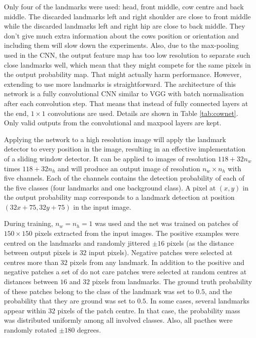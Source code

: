 \documentclass{cta-author}
\begin{document}
Only four of the landmarks were used: head, front middle, cow centre and back middle. 
The discarded landmarks left and right shoulder are close to front middle while the discarded landmarks left 
and right hip are close to back middle. They don't give much extra information about the cows position or 
orientation and including them will slow down the experiments. Also, due to the max-pooling used in the CNN, 
the output feature map has too low resolution to separate such close landmarks well, which mean that they 
might compete for the same pixels in the output probability map. That might actually harm performance. 
However, extending to use more landmarks is straightforward. The architecture of this network is a fully 
convolutional CNN similar to VGG \cite{Simonyan14c} with batch normalisation 
\cite{DBLP:journals/corr/IoffeS15} after each convolution step. That means that instead of fully connected 
layers at the end, $1 \times 1$ convolutions are used. Details are shown in Table \ref{tab:cownet}. Only 
valid outputs from the convolutional and maxpool layers are kept.

Applying the network to a high resolution image will apply the landmark detector to every position in the 
image, resulting in an effective implementation of a sliding window detector. It can be applied to images of 
resolution $118 + 32 n_w$ times $118 + 32 n_h$ and will produce an output image of resolution $n_w \times 
n_h$ with five channels. Each of the channels contains the detection probability of each of the five classes 
(four landmarks and one background class). A pixel at $\left(x, y\right)$ in the output probability map 
corresponds to a landmark detection at position $\left(32 x + 75, 32 y + 75\right)$ in the input image.

During training, $n_w = n_h = 1$ was used and the net was trained on patches of $150\times 150$ pixels 
extracted from the input images. The positive examples were centred on the landmarks and randomly jittered 
$\pm 16$ pixels (as the distance between output pixels is $32$ input pixels). Negative patches were selected 
at centres more than $32$ pixels from any landmark. In addition to the positive and negative patches a set of 
do not care patches were selected at random centres at distances between $16$ and $32$ pixels from landmarks. 
The ground truth probability of these patches belong to the class of the landmark was set to $0.5$, and the 
probability that they are ground was set to $0.5$. In some cases, several landmarks appear within $32$ pixels 
of the patch centre. In that case, the probability mass was distributed uniformly among all involved classes. 
Also, all pacthes were randomly rotated $\pm 180$ degrees. 
\end{document}
